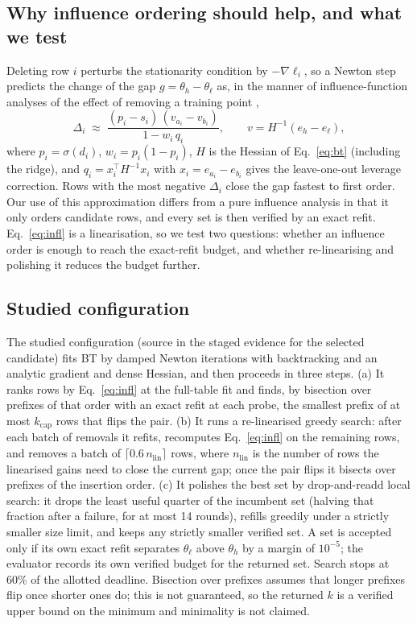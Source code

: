 \documentclass{article}
\newcommand{\kcap}{k_{\mathrm{cap}}}
\newcommand{\hi}{h}
\newcommand{\lo}{\ell}
\begin{document}
\subsection{Why influence ordering should help, and what we test}
Deleting row $i$ perturbs the stationarity condition by $-\nabla\ell_i$, so a Newton step predicts the change of the gap $g=\theta_{\hi}-\theta_{\lo}$ as, in the manner of influence-function analyses of the effect of removing a training point \citep{https://doi.org/10.48550/arxiv.1703.04730},
\begin{equation}
\Delta_i\;\approx\;\frac{(p_i-s_i)\,(v_{a_i}-v_{b_i})}{1-w_i\,q_i},\qquad v=H^{-1}(e_{\hi}-e_{\lo}),
\label{eq:infl}
\end{equation}
where $p_i=\sigma(d_i)$, $w_i=p_i(1-p_i)$, $H$ is the Hessian of Eq.~\eqref{eq:bt} (including the ridge), and $q_i=x_i^\top H^{-1}x_i$ with $x_i=e_{a_i}-e_{b_i}$ gives the leave-one-out leverage correction. Rows with the most negative $\Delta_i$ close the gap fastest to first order. Our use of this approximation differs from a pure influence analysis in that it only orders candidate rows, and every set is then verified by an exact refit. Eq.~\eqref{eq:infl} is a linearisation, so we test two questions: whether an influence order is enough to reach the exact-refit budget, and whether re-linearising and polishing it reduces the budget further.

\subsection{Studied configuration}
The studied configuration (source in the staged evidence for the selected candidate) fits BT by damped Newton iterations with backtracking and an analytic gradient and dense Hessian, and then proceeds in three steps. (a) It ranks rows by Eq.~\eqref{eq:infl} at the full-table fit and finds, by bisection over prefixes of that order with an exact refit at each probe, the smallest prefix of at most $\kcap$ rows that flips the pair. (b) It runs a re-linearised greedy search: after each batch of removals it refits, recomputes Eq.~\eqref{eq:infl} on the remaining rows, and removes a batch of $\lceil 0.6\,n_{\mathrm{lin}}\rceil$ rows, where $n_{\mathrm{lin}}$ is the number of rows the linearised gains need to close the current gap; once the pair flips it bisects over prefixes of the insertion order. (c) It polishes the best set by drop-and-readd local search: it drops the least useful quarter of the incumbent set (halving that fraction after a failure, for at most 14 rounds), refills greedily under a strictly smaller size limit, and keeps any strictly smaller verified set. A set is accepted only if its own exact refit separates $\theta_{\lo}$ above $\theta_{\hi}$ by a margin of $10^{-5}$; the evaluator records its own verified budget for the returned set. Search stops at 60\% of the allotted deadline. Bisection over prefixes assumes that longer prefixes flip once shorter ones do; this is not guaranteed, so the returned $k$ is a verified upper bound on the minimum and minimality is not claimed.
\end{document}
